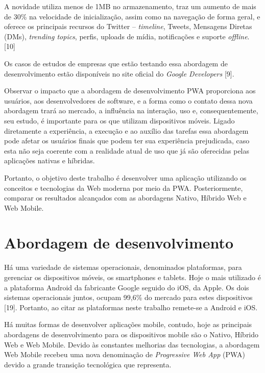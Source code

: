 \begin{citacaodireta}
A novidade utiliza menos de 1MB no armazenamento, traz um aumento de mais de 30\% na velocidade de inicialização, assim como na navegação de forma geral, e oferece os principais recursos do Twitter – \textit{timeline}, Tweets, Mensagens Diretas (DMs), \textit{trending topics}, perfis, uploads de mídia, notificações e suporte \textit{offline}. [10]
\end{citacaodireta}

Os casos de estudos de empresas que estão testando essa abordagem de desenvolvimento estão disponíveis no site oficial do \textit{Google Developers} [9].

Observar o impacto que a abordagem de desenvolvimento PWA proporciona aos usuários, aos desenvolvedores de software, e a forma como o contato dessa nova abordagem trará ao mercado, a influência na interação, uso e, consequentemente, seu estudo, é importante para os que utilizam dispositivos móveis. Ligado diretamente a experiência, a execução e ao auxílio das tarefas essa abordagem pode afetar os usuários finais que podem ter sua experiência prejudicada, caso esta não seja coerente com a realidade atual de uso que já são oferecidas pelas aplicações nativas e híbridas.

Portanto, o objetivo deste trabalho é desenvolver uma aplicação utilizando os conceitos e tecnologias da Web moderna por meio da PWA. Posteriormente, comparar os resultados alcançados com as abordagens Nativo, Híbrido Web e Web Mobile.

\section{\esp Abordagem de desenvolvimento}

Há uma variedade de sistemas operacionais, denominados plataformas, para gerenciar os dispositivos móveis, os smartphones e tablets. Hoje o mais utilizado é a plataforma Android da fabricante Google seguido do iOS, da Apple. Os dois sistemas operacionais juntos, ocupam 99,6\% do mercado para estes dispositivos [19]. Portanto, ao citar as plataformas neste trabalho remete-se a Android e iOS.

Há muitas formas de desenvolver aplicações mobile, contudo, hoje as principais abordagens de desenvolvimento para os dispositivos mobile são o Nativo, Híbrido Web e Web Mobile. Devido às constantes melhorias das tecnologias, a abordagem Web Mobile recebeu uma nova denominação de \textit{Progressive Web App} (PWA) devido a grande transição  tecnológica que representa.

